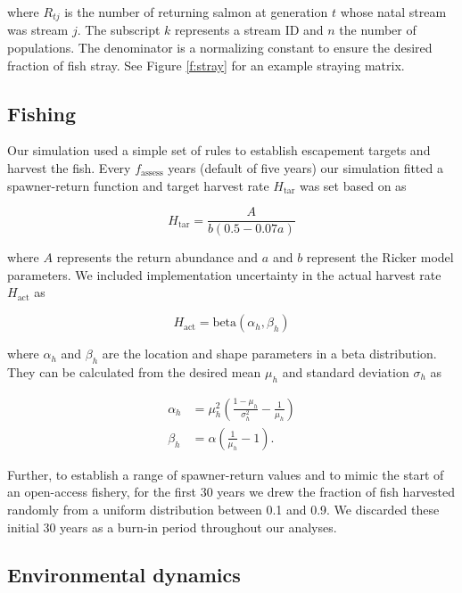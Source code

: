 \noindent where $R_{tj}$ is the number of returning salmon at generation
$t$ whose natal stream was stream $j$. The subscript $k$ represents a
stream ID and $n$ the number of populations. The denominator is a
normalizing constant to ensure the desired fraction of fish stray. See
Figure \ref{f:stray} for an example straying matrix.

\subsection{Fishing}

Our simulation used a simple set of rules to establish escapement
targets and harvest the fish. Every $f_\mathrm{assess}$ years (default
of five years) our simulation fitted a spawner-return function and
target harvest rate $H_{\mathrm{tar}}$ was set based on
\citet{hilborn1992} as

\begin{equation}
  H_{\mathrm{tar}} = \frac{A}{b (0.5 - 0.07a)}
  \label{eq:esc}
\end{equation}

\noindent where $A$ represents the return abundance and $a$ and $b$
represent the Ricker model parameters. We included implementation
uncertainty in the actual harvest rate $H_{\mathrm{act}}$ as

\begin{equation}
  H_{\mathrm{act}} = \mathrm{beta}(\alpha_h, \beta_h)
\end{equation}

\noindent where $\alpha_h$ and $\beta_h$ are the location and shape
parameters in a beta distribution. They can be calculated from the
desired mean $\mu_h$ and standard deviation $\sigma_h$ as
\citep[p.~97]{morgan1990}

\begin{align}
  \alpha_h &= \mu_h^2
                \left(
                \frac{1 - \mu_h}{\sigma_h^2} - \frac{1}{\mu_h}
                \right)\\
   \beta_h &= \alpha \left({\frac{1}{\mu_h} - 1}\right).
\end{align}

\noindent Further, to establish a range of spawner-return values and to
mimic the start of an open-access fishery, for the first 30 years we
drew the fraction of fish harvested randomly from a uniform distribution
between 0.1 and 0.9. We discarded these initial 30 years as a burn-in
period throughout our analyses.

\subsection{Environmental dynamics}

